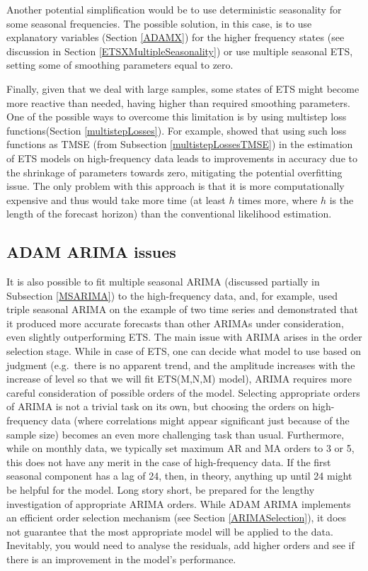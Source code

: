 \documentclass[]{book}
\theoremstyle{definition}
\theoremstyle{definition}
\theoremstyle{definition}
\theoremstyle{definition}
\theoremstyle{remark}
\begin{document}
Another potential simplification would be to use deterministic seasonality for some seasonal frequencies. The possible solution, in this case, is to use explanatory variables (Section \ref{ADAMX}) for the higher frequency states (see discussion in Section \ref{ETSXMultipleSeasonality}) or use multiple seasonal ETS, setting some of smoothing parameters equal to zero.

Finally, given that we deal with large samples, some states of ETS might become more reactive than needed, having higher than required smoothing parameters. One of the possible ways to overcome this limitation is by using multistep loss functions(Section \ref{multistepLosses}). For example, \citet{kourentzes2018smoothing} showed that using such loss functions as TMSE (from Subsection \ref{multistepLossesTMSE}) in the estimation of ETS models on high-frequency data leads to improvements in accuracy due to the shrinkage of parameters towards zero, mitigating the potential overfitting issue. The only problem with this approach is that it is more computationally expensive and thus would take more time (at least \(h\) times more, where \(h\) is the length of the forecast horizon) than the conventional likelihood estimation.

\hypertarget{adam-arima-issues}{%
\subsection{ADAM ARIMA issues}\label{adam-arima-issues}}

It is also possible to fit multiple seasonal ARIMA (discussed partially in Subsection \ref{MSARIMA}) to the high-frequency data, and, for example, \citet{Taylor2010} used triple seasonal ARIMA on the example of two time series and demonstrated that it produced more accurate forecasts than other ARIMAs under consideration, even slightly outperforming ETS. The main issue with ARIMA arises in the order selection stage. While in case of ETS, one can decide what model to use based on judgment (e.g.~there is no apparent trend, and the amplitude increases with the increase of level so that we will fit ETS(M,N,M) model), ARIMA requires more careful consideration of possible orders of the model. Selecting appropriate orders of ARIMA is not a trivial task on its own, but choosing the orders on high-frequency data (where correlations might appear significant just because of the sample size) becomes an even more challenging task than usual. Furthermore, while on monthly data, we typically set maximum AR and MA orders to 3 or 5, this does not have any merit in the case of high-frequency data. If the first seasonal component has a lag of 24, then, in theory, anything up until 24 might be helpful for the model. Long story short, be prepared for the lengthy investigation of appropriate ARIMA orders. While ADAM ARIMA implements an efficient order selection mechanism (see Section \ref{ARIMASelection}), it does not guarantee that the most appropriate model will be applied to the data. Inevitably, you would need to analyse the residuals, add higher orders and see if there is an improvement in the model's performance.
\end{document}
